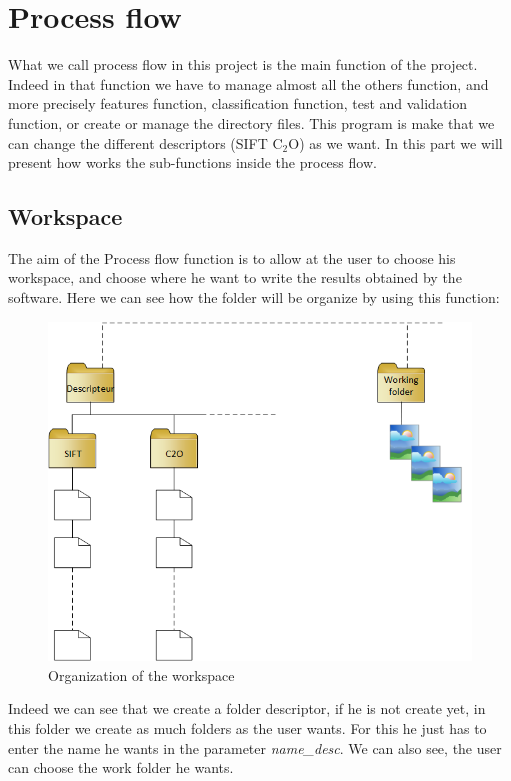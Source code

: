\documentclass[12pt]{article}
\begin{document}
\section{Process flow}

What we call process flow in this project is the main function of the project. Indeed in that function we have to manage almost all the others function, and more precisely features function, classification function, test and validation function, or create or manage the directory files.
This program is make that we can change the different descriptors (SIFT C$_2$O) as we want.
In this part we will present how works the sub-functions inside the process flow.

\subsection{Workspace}

The aim of the Process flow function is to allow at the user to choose his workspace, and choose where he want to write the results obtained by the software. Here we can see how the folder will be organize by using this function:

\begin{figure}[h]
    \includegraphics[scale=0.7]{arborescence.png}
    \caption{Organization of the workspace}\label{fig:process1}
\end{figure}

 Indeed we can see that we create a folder descriptor, if he is not create yet, in this folder we create as much folders as the user wants. For this he just has to enter the name he wants in the parameter \textit{name\_desc}. We can also see, the user can choose the work folder he wants.
\end{document}
